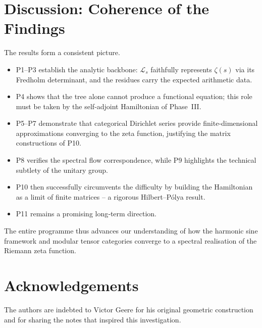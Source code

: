 \documentclass[11pt,a4paper]{article}
\theoremstyle{remark}
\newcommand{\cL}{\mathcal{L}}
\begin{document}
\section{Discussion: Coherence of the Findings}
The results form a consistent picture.
\begin{itemize}
\item P1–P3 establish the analytic backbone: $\cL_s$ faithfully represents $\zeta(s)$ via its Fredholm determinant, and the residues carry the expected arithmetic data.
\item P4 shows that the tree alone cannot produce a functional equation; this role must be taken by the self‑adjoint Hamiltonian of Phase~III.
\item P5–P7 demonstrate that categorical Dirichlet series provide finite‑dimensional approximations converging to the zeta function, justifying the matrix constructions of P10.
\item P8 verifies the spectral flow correspondence, while P9 highlights the technical subtlety of the unitary group.
\item P10 then successfully circumvents the difficulty by building the Hamiltonian as a limit of finite matrices – a rigorous Hilbert–Pólya result.
\item P11 remains a promising long‑term direction.
\end{itemize}
The entire programme thus advances our understanding of how the harmonic sine framework and modular tensor categories converge to a spectral realisation of the Riemann zeta function.

\section*{Acknowledgements}
The authors are indebted to Victor Geere for his original geometric construction and for sharing the notes that inspired this investigation.
\end{document}
